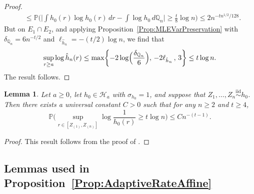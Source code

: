 \documentclass[a4paper,12pt]{article}
\newtheorem{lemma}[theorem]{Lemma}
\begin{document}
\begin{proof}
\begin{align*}
 &\leq \mathbb{P}\biggl(\biggl|\int h_0(r) \log h_0(r) \, dr - \int \log h_0 \, d\mathbb{Q}_n\biggr| \geq \frac{t}{8} \log n\biggr) \leq 2n^{-t n^{1/2}/128}.
\end{align*}
But on $E_1 \cap E_2$, and applying Proposition~\ref{Prop:MLEVarPreservation} with $\delta_{\mathbb{Q}_n} = 6n^{-t/2}$ and $\ell_{\hat{h}_n} = -(t/2)\log n$, we find that 
\[
\sup_{r \geq a} \log \hat{h}_n(r) \leq \max \biggl\{ - 2 \log \Bigl( \frac{\delta_{\mathbb{Q}_n}}{6} \Bigr),\, - 2 \ell_{\hat{h}_n} \, , \, 3\biggr\} \leq t \log n.
\]
The result follows.
\end{proof}
\begin{lemma} 
  \label{Lem:ExtremeEventControl2}
Let $a \geq 0$, let $h_0 \in \mathcal{H}_{a}$ with $\sigma_{h_0}=1$, and suppose that $Z_1,\ldots,Z_n \stackrel{\mathrm{iid}}{\sim} h_0$. Then there exists a universal constant $C > 0$ such that for any $n \geq 2$ and $t \geq 4$,
  \[
\mathbb{P}\biggl(\sup_{r \in [Z_{(1)}, Z_{(n)}]} \log \frac{1}{h_0(r)} \geq t \log n\biggr) \leq Cn^{-(t-1)}.
  \]
\end{lemma}
\begin{proof}
This result follows from the proof of \citet[][Lemma~2]{kim2016adaptationsupp}.
\end{proof}

\subsection{Lemmas used in Proposition~\ref{Prop:AdaptiveRateAffine}}

\label{Sec:LocalBrackets}
 
\end{document}
